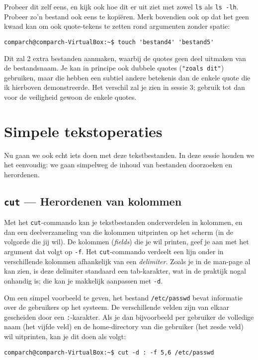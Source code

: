 \documentclass[a4paper,twoside,openany]{memoir}
\begin{document}
Probeer dit zelf eens, en kijk ook hoe dit er uit ziet met zowel \verb!ls! als
\verb!ls -lh!. Probeer zo'n bestand ook eens te kopiëren. Merk bovendien ook op
dat het geen kwaad kan om ook quote-tekens te zetten rond argumenten zonder
spatie:

\begin{verbatim}
comparch@comparch-VirtualBox:~$ touch 'bestand4' 'bestand5'
\end{verbatim}

Dit zal 2 extra bestanden aanmaken, waarbij de quotes geen deel uitmaken van de
bestandsnaam. Je kan in principe ook dubbele quotes (\verb!"zoals dit"!)
gebruiken, maar die hebben een subtiel andere betekenis dan de enkele quote die
ik hierboven demonstreerde. Het verschil zal je zien in sessie 3; gebruik tot
dan voor de veiligheid gewoon de enkele quotes.

\chapter{Simpele tekstoperaties}

Nu gaan we ook echt iets doen met deze tekstbestanden. In deze sessie houden we
het eenvoudig: we gaan simpelweg de inhoud van bestanden doorzoeken en
herordenen.

\section{\texttt{cut} --- Herordenen van kolommen}

Met het \verb!cut!-commando kan je tekstbestanden onderverdelen in kolommen, en
dan een deelverzameling van die kolommen uitprinten op het scherm (in de
volgorde die jij wil). De kolommen (\emph{fields}) die je wil printen, geef je
aan met het argument dat volgt op \verb!-f!. Het \verb!cut!-commando verdeelt
een lijn onder in verschillende kolommen afhankelijk van een \emph{delimiter}.
Zoals je in de man-page al kan zien, is deze delimiter standaard een
tab-karakter, wat in de praktijk nogal onhandig is; die kan je makkelijk
aanpassen met \verb!-d!.

Om een simpel voorbeeld te geven, het bestand \verb!/etc/passwd! bevat
informatie over de gebruikers op het systeem. De verschillende velden zijn van
elkaar gescheiden door een \verb!:!-karakter. Als je dan bijvoorbeeld per
gebruiker de volledige naam (het vijfde veld) en de home-directory van die
gebruiker (het zesde veld) wil uitprinten, kan je dit doen als volgt:

\begin{verbatim}
comparch@comparch-VirtualBox:~$ cut -d : -f 5,6 /etc/passwd
\end{verbatim}
\end{document}
